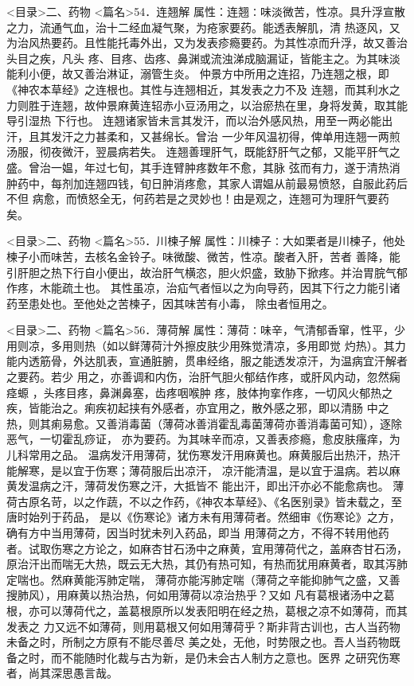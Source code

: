 \documentclass[a4paper,12pt,UTF8,twoside]{ctexbook}
\begin{document}
<目录>二、药物
<篇名>54．连翘解
属性：连翘∶味淡微苦，性凉。具升浮宣散之力，流通气血，治十二经血凝气聚，为疮家要药。能透表解肌，清 
热逐风，又为治风热要药。且性能托毒外出，又为发表疹瘾要药。为其性凉而升浮，故又善治头目之疾，凡头 
疼、目疼、齿疼、鼻渊或流浊涕成脑漏证，皆能主之。为其味淡能利小便，故又善治淋证，溺管生炎。 
仲景方中所用之连招，乃连翘之根，即《神农本草经》之连根也。其性与连翘相近，其发表之力不及 
连翘，而其利水之力则胜于连翘，故仲景麻黄连轺赤小豆汤用之，以治瘀热在里，身将发黄，取其能导引湿热 
下行也。 
连翘诸家皆未言其发汗，而以治外感风热，用至一两必能出汗，且其发汗之力甚柔和，又甚绵长。曾治 
一少年风温初得，俾单用连翘一两煎汤服，彻夜微汗，翌晨病若失。 
连翘善理肝气，既能舒肝气之郁，又能平肝气之盛。曾治一媪，年过七旬，其手连臂肿疼数年不愈，其脉 
弦而有力，遂于清热消肿药中，每剂加连翘四钱，旬日肿消疼愈，其家人谓媪从前最易愤怒，自服此药后不但 
病愈，而愤怒全无，何药若是之灵妙也！由是观之，连翘可为理肝气要药矣。 

<目录>二、药物
<篇名>55．川楝子解
属性：川楝子∶大如栗者是川楝子，他处楝子小而味苦，去核名金铃子。味微酸、微苦，性凉。酸者入肝，苦者 
善降，能引肝胆之热下行自小便出，故治肝气横恣，胆火炽盛，致胁下掀疼。并治胃脘气郁作疼，木能疏土也。 
其性虽凉，治疝气者恒以之为向导药，因其下行之力能引诸药至患处也。至他处之苦楝子，因其味苦有小毒， 
除虫者恒用之。 

<目录>二、药物
<篇名>56．薄荷解
属性：薄荷∶味辛，气清郁香窜，性平，少用则凉，多用则热（如以鲜薄荷汁外擦皮肤少用殊觉清凉，多用即觉 
灼热）。其力能内透筋骨，外达肌表，宣通脏腑，贯串经络，服之能透发凉汗，为温病宜汗解者之要药。若少 
用之，亦善调和内伤，治肝气胆火郁结作疼，或肝风内动，忽然痫痉螈 ，头疼目疼，鼻渊鼻塞，齿疼咽喉肿 
疼，肢体拘挛作疼，一切风火郁热之疾，皆能治之。痢疾初起挟有外感者，亦宜用之，散外感之邪，即以清肠 
中之热，则其痢易愈。又善消毒菌（薄荷冰善消霍乱毒菌薄荷亦善消毒菌可知），逐除恶气，一切霍乱痧证， 
亦为要药。为其味辛而凉，又善表疹瘾，愈皮肤瘙痒，为儿科常用之品。 
温病发汗用薄荷，犹伤寒发汗用麻黄也。麻黄服后出热汗，热汗能解寒，是以宜于伤寒；薄荷服后出凉汗， 
凉汗能清温，是以宜于温病。若以麻黄发温病之汗，薄荷发伤寒之汗，大抵皆不 
能出汗，即出汗亦必不能愈病也。 
薄荷古原名苛，以之作蔬，不以之作药，《神农本草经》、《名医别录》皆未载之，至唐时始列于药品， 
是以《伤寒论》诸方未有用薄荷者。然细审《伤寒论》之方，确有方中当用薄荷，因当时犹未列入药品，即当 
用薄荷之方，不得不转用他药者。试取伤寒之方论之，如麻杏甘石汤中之麻黄，宜用薄荷代之，盖麻杏甘石汤， 
原治汗出而喘无大热，既云无大热，其仍有热可知，有热而犹用麻黄者，取其泻肺定喘也。然麻黄能泻肺定喘， 
薄荷亦能泻肺定喘（薄荷之辛能抑肺气之盛，又善搜肺风），用麻黄以热治热，何如用薄荷以凉治热乎？又如 
凡有葛根诸汤中之葛根，亦可以薄荷代之，盖葛根原所以发表阳明在经之热，葛根之凉不如薄荷，而其发表之 
力又远不如薄荷，则用葛根又何如用薄荷乎？斯非背古训也，古人当药物未备之时，所制之方原有不能尽善尽 
美之处，无他，时势限之也。吾人当药物既备之时，而不能随时化裁与古为新，是仍未会古人制方之意也。医界 
之研究伤寒者，尚其深思愚言哉。 
\end{document}
